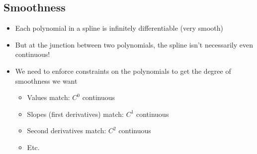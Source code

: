 \documentclass{article}
\begin{document}
\subsection*{Smoothness}
\begin{itemize}
    \item Each polynomial in a spline is infinitely differentiable (very smooth)
    \item But at the junction between two polynomials, the spline isn't necessarily even continuous!
    \item We need to enforce constraints on the polynomials to get the degree of smoothness we want
    \begin{itemize}
        \item Values match: $C^0$ continuous
        \item Slopes (first derivatives) match: $C^1$ continuous
        \item Second derivatives match: $C^2$ continuous
        \item Etc.
    \end{itemize}
\end{itemize}
\end{document}
